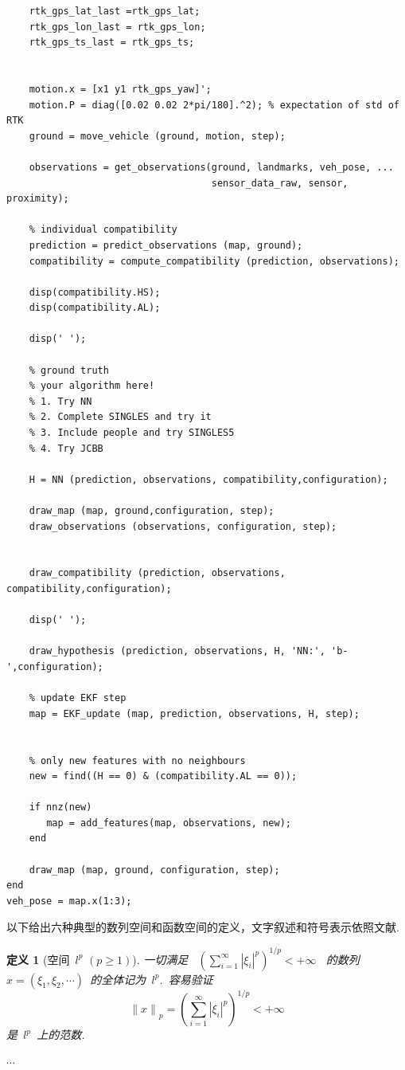 \documentclass[12pt,a4paper]{article}
\newtheorem{definition}{定义}
\begin{document}
{{{\begin{verbatim}
    rtk_gps_lat_last =rtk_gps_lat;
    rtk_gps_lon_last = rtk_gps_lon;
    rtk_gps_ts_last = rtk_gps_ts; 


    motion.x = [x1 y1 rtk_gps_yaw]';
    motion.P = diag([0.02 0.02 2*pi/180].^2); % expectation of std of RTK   
    ground = move_vehicle (ground, motion, step);    

    observations = get_observations(ground, landmarks, veh_pose, ...
                                    sensor_data_raw, sensor, proximity);
    
    % individual compatibility
    prediction = predict_observations (map, ground);
    compatibility = compute_compatibility (prediction, observations);

    disp(compatibility.HS);
    disp(compatibility.AL);

    disp(' ');
    
    % ground truth
    % your algorithm here!
    % 1. Try NN
    % 2. Complete SINGLES and try it
    % 3. Include people and try SINGLES5
    % 4. Try JCBB
    
    H = NN (prediction, observations, compatibility,configuration);

    draw_map (map, ground,configuration, step);
    draw_observations (observations, configuration, step);
    
    
    draw_compatibility (prediction, observations, compatibility,configuration);

    disp(' ');
    
    draw_hypothesis (prediction, observations, H, 'NN:', 'b-',configuration);

    % update EKF step
    map = EKF_update (map, prediction, observations, H, step);
    

    % only new features with no neighbours
    new = find((H == 0) & (compatibility.AL == 0));
    
    if nnz(new)
       map = add_features(map, observations, new);
    end

    draw_map (map, ground, configuration, step); 
end
veh_pose = map.x(1:3);

\end{verbatim}


以下给出六种典型的数列空间和函数空间的定义，文字叙述和符号表示依照文献\cite{1}.\\




\begin{definition}[空间~$l^p$   $(p\geq 1)$]               %
一切满足
~$(\sum\limits^{\infty}_{i=1}|\xi_i|^p)^{1/p}<+\infty$~    %
的数列~$x=(\xi_1,\xi_2,\cdots)$~的全体记为~$l^p$.\ 容易验证
$${\parallel x\parallel}_{p}=(\sum^{\infty}_{i=1}|\xi_i|^p)^{1/p}<+\infty$$ 是~$l^p$~上的范数.
\end{definition}
$\cdots$



}}}
\end{document}
